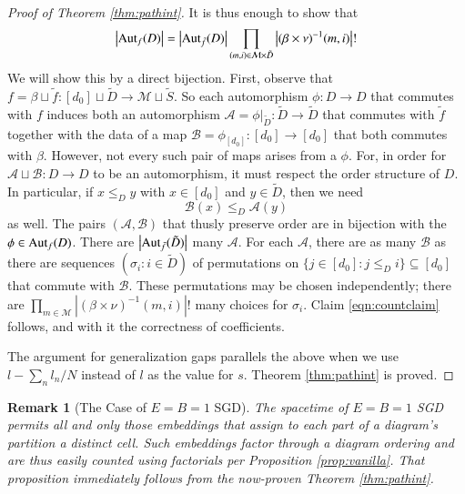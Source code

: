 \documentclass[final,12pt]{colt2021} %
\newtheorem{rmk}{Remark}
\newcommand{\wabs}[1]{\left|#1\right|}
\newcommand{\Aut}{\text{\textnormal{Aut}}}
\newcommand{\Aa}{\mathcal{A}}
\newcommand{\Bb}{\mathcal{B}}
\newcommand{\Mm}{\mathcal{M}}
\begin{document}
\begin{proof}[Proof of Theorem \ref{thm:pathint}]
            It is thus enough to show that
            \begin{align*} \label{eqn:countclaim}
                \wabs{\Aut_f(D)} = 
                \wabs{\Aut_{\tilde f}(D)}
                \prod_{(m, i) \in \Mm \times \tilde D}
                    \wabs{(\beta \times \nu)^{-1}(m, i)}!
            \end{align*}
            We will show this by a direct bijection.  First, observe that
            $
                f = \beta \sqcup \tilde f:
                    [d_0] \sqcup \tilde D \to \Mm \sqcup \tilde S
            $. 
            So each automorphism $\phi: D\to D$ that commutes with $f$ induces
            both an automorphism
            $
                \Aa = \phi|_{\tilde D}: \tilde D\to \tilde D
            $
            that commutes with $\tilde f$ together with the data of a map
            $
                \Bb = \phi_{[d_0]}: [d_0] \to [d_0] 
            $
            that both commutes with $\beta$.  However, not every such pair of
            maps arises from a $\phi$.  For, in order for $\Aa \sqcup \Bb: D
            \to D$ to be an automorphism, it must respect the order structure
            of $D$.  In particular, if $x\leq_D y$ with $x \in [d_0]$ and $y
            \in \tilde D$, then we need
            $$
                \Bb(x) \leq_D \Aa(y)
            $$
            as well.  The
            pairs $(\Aa, \Bb)$ that thusly preserve order are in bijection with
            the $\phi \in \Aut_f(D)$.  There are $\wabs{\Aut_{\tilde f}(\tilde
            D)}$ many $\Aa$.  For each $\Aa$, there are as many $\Bb$ as there
            are sequences $(\sigma_i: i \in \tilde D)$ of permutations on
            $
                \{j\in [d_0]: j\leq_D i\} \subseteq [d_0]
            $ 
            that commute with $\Bb$.  These permutations may be chosen
            independently; there are 
            $
                \prod_{m\in \Mm}
                    \wabs{(\beta \times \nu)^{-1}(m, i)}!
            $
            many choices for $\sigma_i$.  Claim \ref{eqn:countclaim} follows,
            and with it the correctness of coefficients.
 
            The argument for generalization gaps parallels the above when we
            use $l-\sum_n l_n/N$ instead of $l$ as the value for $s$. 
            Theorem \ref{thm:pathint} is proved.
        \end{proof}

        \begin{rmk}[The Case of $E=B=1$ SGD]
            The spacetime of $E=B=1$ SGD permits all and only those
            embeddings that assign to each part of a diagram's partition  a
            distinct cell.  Such embeddings factor through a diagram
            ordering and are thus easily counted using factorials per
            Proposition \ref{prop:vanilla}.  That proposition immediately
            follows from the now-proven Theorem \ref{thm:pathint}.
        \end{rmk}
\end{document}
